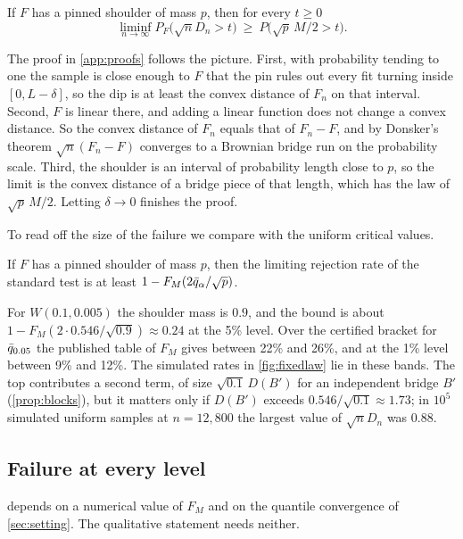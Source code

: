 \begin{theorem}\label{thm:shoulder}
If $F$ has a pinned shoulder of mass $p$, then for every $t\ge0$
\[
\liminf_{n\to\infty}P_F\bigl(\sqrt nD_n>t\bigr)\ \ge\ P\bigl(\sqrt p\,M/2>t\bigr).
\]
\end{theorem}

The proof in \cref{app:proofs} follows the picture. First, with probability tending to one the sample is close enough to $F$ that the pin rules out every fit turning inside $[0,L-\delta]$, so the dip is at least the convex distance of $F_n$ on that interval. Second, $F$ is linear there, and adding a linear function does not change a convex distance. So the convex distance of $F_n$ equals that of $F_n-F$, and by Donsker's theorem $\sqrt n(F_n-F)$ converges to a Brownian bridge run on the probability scale. Third, the shoulder is an interval of probability length close to $p$, so the limit is the convex distance of a bridge piece of that length, which has the law of $\sqrt p\,M/2$. Letting $\delta\to0$ finishes the proof.

To read off the size of the failure we compare with the uniform critical values.

\begin{corollary}\label{cor:shoulder}
If $F$ has a pinned shoulder of mass $p$, then the limiting rejection rate of the standard test is at least $1-F_M(2\bar q_\alpha/\sqrt p)$.
\end{corollary}

For $W(0.1,0.005)$ the shoulder mass is $0.9$, and the bound is about $1-F_M(2\cdot0.546/\sqrt{0.9})\approx0.24$ at the 5\% level. Over the certified bracket for $\bar q_{0.05}$ the published table of $F_M$ gives between 22\% and 26\%, and at the 1\% level between 9\% and 12\%. The simulated rates in \cref{fig:fixedlaw} lie in these bands. The top contributes a second term, of size $\sqrt{0.1}\,D(B')$ for an independent bridge $B'$ (\cref{prop:blocks}), but it matters only if $D(B')$ exceeds $0.546/\sqrt{0.1}\approx1.73$; in $10^5$ simulated uniform samples at $n=12{,}800$ the largest value of $\sqrt nD_n$ was $0.88$.

\subsection{Failure at every level}
 depends on a numerical value of $F_M$ and on the quantile convergence of \cref{sec:setting}. The qualitative statement needs neither.

